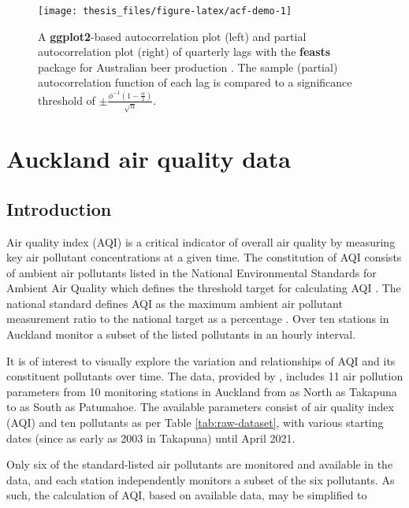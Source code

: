 \documentclass{aucklandthesis}
\begin{document}
\begin{figure}
\texttt{[image: thesis\_files/figure-latex/acf-demo-1]} \caption{A \textbf{ggplot2}-based autocorrelation plot (left) and partial autocorrelation plot (right) of quarterly lags with the \textbf{feasts} package for Australian beer production \autocite{fpp3d}. The sample (partial) autocorrelation function of each lag is compared to a significance threshold of \(\pm \frac{\phi^{-1} (1 - \frac{\alpha}{2})}{\sqrt{n}}\).}\label{fig:acf-demo}
\end{figure}



\hypertarget{ch:data}{%
\chapter{Auckland air quality data}\label{ch:data}}

\hypertarget{introduction}{%
\section{Introduction}\label{introduction}}

Air quality index (AQI) is a critical indicator of overall air quality by measuring key air pollutant concentrations at a given time. The constitution of AQI consists of ambient air pollutants listed in the National Environmental Standards for Ambient Air Quality which defines the threshold target for calculating AQI \autocite{aqi}. The national standard defines AQI as the maximum ambient air pollutant measurement ratio to the national target as a percentage \autocite{aqitarget}. Over ten stations in Auckland monitor a subset of the listed pollutants in an hourly interval.

It is of interest to visually explore the variation and relationships of AQI and its constituent pollutants over time. The data, provided by \textcite{aklenvdata}, includes 11 air pollution parameters from 10 monitoring stations in Auckland from as North as Takapuna to as South as Patumahoe. The available parameters consist of air quality index (AQI) and ten pollutants as per Table \ref{tab:raw-dataset}, with various starting dates (since as early as 2003 in Takapuna) until April 2021.

Only six of the standard-listed air pollutants are monitored and available in the data, and each station independently monitors a subset of the six pollutants. As such, the calculation of AQI, based on available data, may be simplified to
\end{document}
